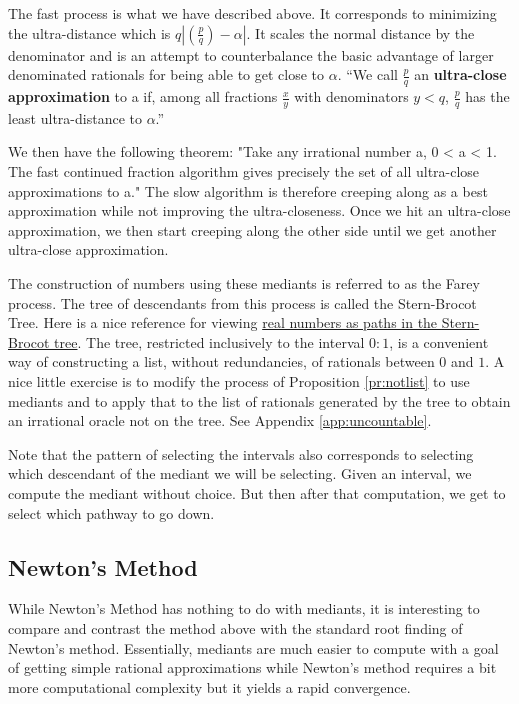 \documentclass[12pt]{article}
\theoremstyle{remark}
\begin{document}
The fast process is what we have described above. It corresponds to minimizing the ultra-distance which is $q|(\frac{p}{q})-\alpha|$. It scales the normal distance by the denominator and is an attempt to counterbalance the basic advantage of larger denominated rationals for being able to get close to $\alpha$.  ``We call $\frac{p}{q}$ an \textbf{ultra-close approximation} to a if, among all fractions $\frac{x}{y}$ with denominators $y < q$, $\frac{p}{q}$ has the least ultra-distance to $\alpha$.''

We then have the following theorem: "Take any irrational number a, 0 < a < 1. The fast continued fraction algorithm gives precisely the set of all ultra-close approximations to a."  The slow algorithm is therefore creeping along as a best approximation while not improving the ultra-closeness. Once we hit an ultra-close approximation, we then start creeping along the other side until we get another ultra-close approximation. 

The construction of numbers using these mediants is referred to as the Farey process. The tree of descendants from this process is called the Stern-Brocot Tree. Here is a nice reference for viewing \href{https://mattbaker.blog/2019/01/28/the-stern-brocot-tree-hurwitzs-theorem-and-the-markoff-uniqueness-conjecture/}{real numbers as paths in the Stern-Brocot tree}. The tree, restricted inclusively to the interval $0:1$, is a convenient way of constructing a list, without redundancies, of rationals between $0$ and $1$. A nice little exercise is to modify the process of Proposition \ref{pr:notlist} to use mediants and to apply that to the list of rationals generated by the tree to obtain an irrational oracle not on the tree.  See Appendix \ref{app:uncountable}.

Note that the pattern of selecting the intervals also corresponds to selecting which descendant of the mediant we will be selecting. Given an interval, we compute the mediant without choice. But then after that computation, we get to select which pathway to go down. 


\subsection{Newton's Method}

While Newton's Method has nothing to do with mediants, it is interesting to compare and contrast the method above with the standard root finding of Newton's method. Essentially, mediants are much easier to compute with a goal of getting simple rational approximations while Newton's method requires a bit more computational complexity but it yields a rapid convergence. 
\end{document}

